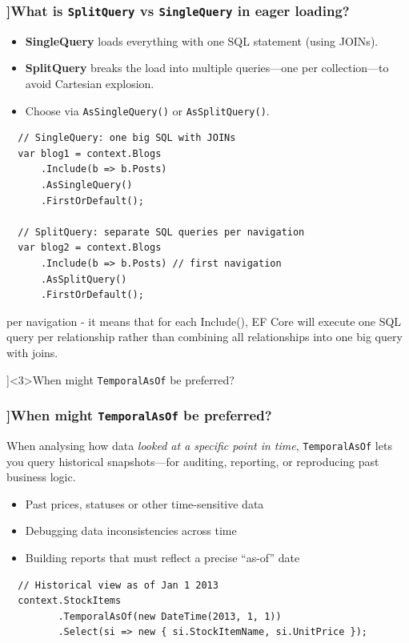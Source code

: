 \begin{frame}[fragile]
  \frametitle{\AnswerTitle[\CategoryBadge[OOPColor!20]{C\#} ]{What is \texttt{SplitQuery} vs \texttt{SingleQuery} in eager loading?}}

  {\footnotesize
  \begin{itemize}
    \item \textbf{SingleQuery} loads everything with one SQL statement (using JOINs).
    \item \textbf{SplitQuery} breaks the load into multiple queries—one per collection—to avoid Cartesian explosion.
    \item Choose via \texttt{AsSingleQuery()} or \texttt{AsSplitQuery()}.
  \end{itemize}
  }

  \begin{verbatim}
  // SingleQuery: one big SQL with JOINs
  var blog1 = context.Blogs
      .Include(b => b.Posts)
      .AsSingleQuery()
      .FirstOrDefault();

  // SplitQuery: separate SQL queries per navigation
  var blog2 = context.Blogs
      .Include(b => b.Posts) // first navigation
      .AsSplitQuery()
      .FirstOrDefault();
  \end{verbatim}

  {\tiny
  per navigation - it means that for each Include(), EF Core will execute one SQL query per relationship rather than combining all relationships into one big query with joins.
  }
\end{frame}

\QuestionSlide[\CategoryBadge[PerfColor!20]{Async \& Threading}]<3>{When might \texttt{TemporalAsOf} be preferred?}

\begin{frame}[fragile]
  \frametitle{\AnswerTitle[\CategoryBadge[OOPColor!20]{C\#} ]{When might \texttt{TemporalAsOf} be preferred?}}

  {\footnotesize
  When analysing how data \emph{looked at a specific point in time},
  \texttt{TemporalAsOf} lets you query historical snapshots—for auditing,
  reporting, or reproducing past business logic.

  \begin{itemize}
    \item Past prices, statuses or other time-sensitive data  
    \item Debugging data inconsistencies across time  
    \item Building reports that must reflect a precise “as-of” date
  \end{itemize}
  }

  \begin{verbatim}
  // Historical view as of Jan 1 2013
  context.StockItems
         .TemporalAsOf(new DateTime(2013, 1, 1))
         .Select(si => new { si.StockItemName, si.UnitPrice });
  \end{verbatim}
\end{frame}
